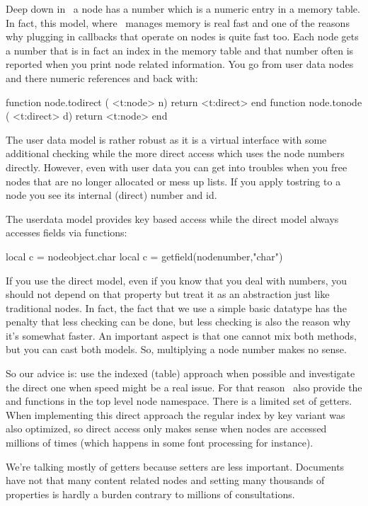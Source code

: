 \stopsubsection

\startsubsection[title={Two access models}]

Deep down in \TEX\ a node has a number which is a numeric entry in a memory
table. In fact, this model, where \TEX\ manages memory is real fast and one of
the reasons why plugging in callbacks that operate on nodes is quite fast too.
Each node gets a number that is in fact an index in the memory table and that
number often is reported when you print node related information. You go from
user data nodes and there numeric references and back with:

\starttyping[option=LUA]
function node.todirect ( <t:node>   n) return <t:direct> end
function node.tonode   ( <t:direct> d) return <t:node>   end
\stoptyping

The user data model is rather robust as it is a virtual interface with some
additional checking while the more direct access which uses the node numbers
directly. However, even with user data you can get into troubles when you free
nodes that are no longer allocated or mess up lists. If you apply \type
{tostring} to a node you see its internal (direct) number and id.

The userdata model provides key based access while the direct model always
accesses fields via functions:

\starttyping[option=LUA]
local c = nodeobject.char
local c = getfield(nodenumber,"char")
\stoptyping

If you use the direct model, even if you know that you deal with numbers, you
should not depend on that property but treat it as an abstraction just like
traditional nodes. In fact, the fact that we use a simple basic datatype has the
penalty that less checking can be done, but less checking is also the reason why
it's somewhat faster. An important aspect is that one cannot mix both methods,
but you can cast both models. So, multiplying a node number makes no sense.

So our advice is: use the indexed (table) approach when possible and investigate
the direct one when speed might be a real issue. For that reason \LUATEX\ also
provide the  and  functions in the top level node
namespace. There is a limited set of getters. When implementing this direct
approach the regular index by key variant was also optimized, so direct access
only makes sense when nodes are accessed millions of times (which happens in some
font processing for instance).

We're talking mostly of getters because setters are less important. Documents
have not that many content related nodes and setting many thousands of properties
is hardly a burden contrary to millions of consultations.

